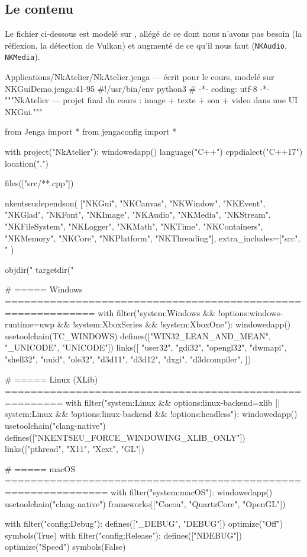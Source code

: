 \subsection{Le contenu}

Le fichier ci-dessous est modelé sur
, allégé de ce dont nous n'avons
pas besoin (la réflexion, la détection de Vulkan) et augmenté de ce qu'il nous
faut (\texttt{NKAudio}, \texttt{NKMedia}).

\begin{nkcode}{Applications/NkAtelier/NkAtelier.jenga — écrit pour le cours, modelé sur NKGuiDemo.jenga:41-95}
#!/usr/bin/env python3
# -*- coding: utf-8 -*-
"""NkAtelier — projet final du cours : image + texte + son + video dans une UI NKGui."""

from Jenga import *
from jengaconfig import *


with project("NkAtelier"):
    windowedapp()
    language("C++")
    cppdialect("C++17")
    location(".")

    files(["src/**.cpp"])

    nkentseudependson(
        ["NKGui", "NKCanvas", "NKWindow", "NKEvent", "NKGlad",
         "NKFont", "NKImage", "NKAudio", "NKMedia",
         "NKStream", "NKFileSystem", "NKLogger", "NKMath", "NKTime",
         "NKContainers", "NKMemory", "NKCore", "NKPlatform", "NKThreading"],
        extra_includes=["src", "%
    )

    objdir("%
    targetdir("%

    # ===== Windows ============================================================
    with filter("system:Windows && !options:windows-runtime=uwp && !system:XboxSeries && !system:XboxOne"):
        windowedapp()
        usetoolchain(TC_WINDOWS)
        defines(["WIN32_LEAN_AND_MEAN", "_UNICODE", "UNICODE"])
        links([
            "user32", "gdi32", "opengl32", "dwmapi", "shell32",
            "uuid", "ole32",
            "d3d11", "d3d12", "dxgi", "d3dcompiler",
        ])

    # ===== Linux (XLib) =======================================================
    with filter("system:Linux && options:linux-backend=xlib || system:Linux && !options:linux-backend && !options:headless"):
        windowedapp()
        usetoolchain("clang-native")
        defines(["NKENTSEU_FORCE_WINDOWING_XLIB_ONLY"])
        links(["pthread", "X11", "Xext", "GL"])

    # ===== macOS ==============================================================
    with filter("system:macOS"):
        windowedapp()
        usetoolchain("clang-native")
        frameworks(["Cocoa", "QuartzCore", "OpenGL"])

    with filter("config:Debug"):
        defines(["_DEBUG", "DEBUG"])
        optimize("Off")
        symbols(True)
    with filter("config:Release"):
        defines(["NDEBUG"])
        optimize("Speed")
        symbols(False)
\end{nkcode}

